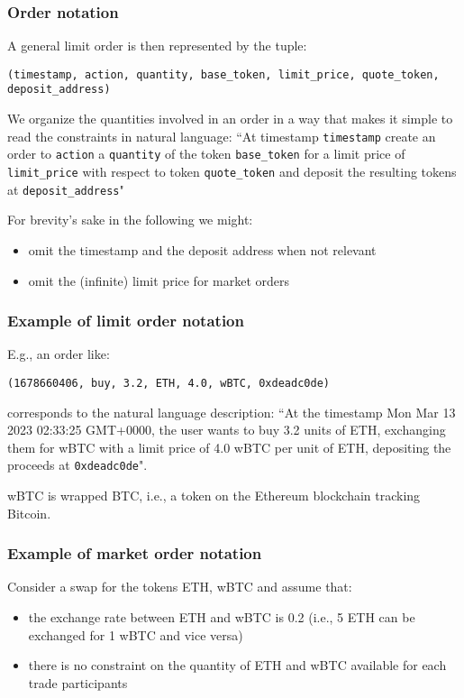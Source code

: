 \documentclass[11pt, reqno]{amsart}
\begin{document}
\subsubsection{Order notation}
A general limit order is then represented by the tuple:
\begin{center}
	\texttt{(timestamp, action, quantity, base\_token, limit\_price, quote\_token, 
     deposit\_address)}
\end{center}

We organize the quantities involved in an order in a way that makes it simple
to read the constraints in natural language: ``At timestamp \texttt{timestamp}
create an order to \texttt{action} a \texttt{quantity} of the token
\texttt{base\_token} for a limit price of \texttt{limit\_price} with respect to
token \texttt{quote\_token} and deposit the resulting tokens at
\texttt{deposit\_address}"

For brevity's sake in the following we might:
\begin{itemize}
	\item omit the timestamp and the deposit address when not relevant
	\item omit the (infinite) limit price for market orders
\end{itemize}

\subsubsection{Example of limit order notation}
E.g., an order like:
\begin{center}
	\texttt{(1678660406, buy, 3.2, ETH, 4.0, wBTC, \texttt{0xdeadc0de})}
\end{center}
corresponds to the natural language description:
``At the timestamp Mon Mar 13 2023 02:33:25 GMT+0000, the user wants to buy 3.2
units of ETH, exchanging them for wBTC with a limit price of 4.0 wBTC per unit
of ETH, depositing the proceeds at \texttt{0xdeadc0de}".

wBTC is wrapped BTC, i.e., a token on the Ethereum blockchain tracking Bitcoin.

\subsubsection{Example of market order notation}
Consider a swap for the tokens ETH, wBTC and assume that:
\begin{itemize}
\item the exchange rate between ETH and wBTC is 0.2 (i.e., 5 ETH can be
  exchanged for 1 wBTC and vice versa)
\item there is no constraint on the quantity of ETH and wBTC available for each
  trade participants
\end{itemize}
\end{document}

